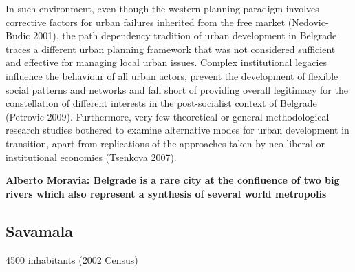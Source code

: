 \documentclass[11pt]{report}
\begin{document}
In such environment, even though the western planning paradigm involves corrective factors for urban failures inherited from the free market (Nedovic-Budic 2001), the path dependency tradition of urban development in Belgrade traces a different urban planning framework that was not considered sufficient and effective for managing local urban issues. Complex institutional legacies influence the behaviour of all urban actors, prevent the development of flexible social patterns and networks and fall short of providing overall legitimacy for the constellation of different interests in the post-socialist context of Belgrade (Petrovic 2009). Furthermore, very few theoretical or general methodological research studies bothered to examine alternative modes for urban development in transition, apart from replications of the approaches taken by neo-liberal or institutional economies (Tsenkova 2007).
   
\textbf{Alberto Moravia: Belgrade is a rare city at the confluence of two big rivers which also represent a synthesis of several world metropolis}

\subsection{Savamala}

4500 inhabitants (2002 Census)
\end{document}
